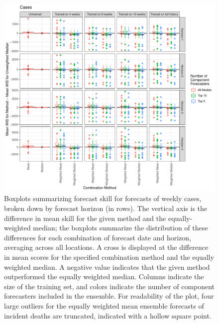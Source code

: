\documentclass[review]{elsarticle}
\begin{document}
\begin{figure}
  \includegraphics[width=\textwidth]{figures/wis_boxplots_main_by_horizon_Cases.pdf}
  \caption{Boxplots summarizing forecast skill for forecasts of weekly cases, broken down by forecast horizon (in rows).
  The vertical axis is the difference in mean skill for the given method and the equally-weighted median;
  the boxplots summarize the distribution of these differences for each combination of forecast date and horizon, averaging across all locations.
  A cross is displayed at the difference in mean scores for the specified combination method and the equally weighted median.
  A negative value indicates that the given method outperformed the equally weighted median.
  Columns indicate the size of the training set, and colors indicate the number of component forecasters included in the ensemble.
  For readability of the plot, four large outliers for the equally weighted mean ensemble forecasts of incident deaths are truncated, indicated with a hollow square point.}
\end{figure}
\end{document}

